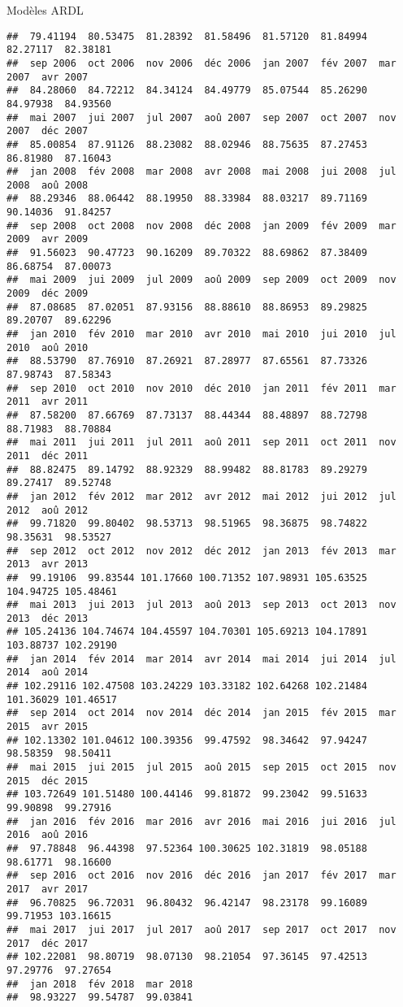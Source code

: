 \documentclass[10pt,xcolor=table,color={dvipsnames,usenames},ignorenonframetext,usepdftitle=false,french]{beamer}
\begin{document}
\begin{frame}[fragile]{Modèles ARDL}
\begin{verbatim}
##  79.41194  80.53475  81.28392  81.58496  81.57120  81.84994  82.27117  82.38181 
##  sep 2006  oct 2006  nov 2006  déc 2006  jan 2007  fév 2007  mar 2007  avr 2007 
##  84.28060  84.72212  84.34124  84.49779  85.07544  85.26290  84.97938  84.93560 
##  mai 2007  jui 2007  jul 2007  aoû 2007  sep 2007  oct 2007  nov 2007  déc 2007 
##  85.00854  87.91126  88.23082  88.02946  88.75635  87.27453  86.81980  87.16043 
##  jan 2008  fév 2008  mar 2008  avr 2008  mai 2008  jui 2008  jul 2008  aoû 2008 
##  88.29346  88.06442  88.19950  88.33984  88.03217  89.71169  90.14036  91.84257 
##  sep 2008  oct 2008  nov 2008  déc 2008  jan 2009  fév 2009  mar 2009  avr 2009 
##  91.56023  90.47723  90.16209  89.70322  88.69862  87.38409  86.68754  87.00073 
##  mai 2009  jui 2009  jul 2009  aoû 2009  sep 2009  oct 2009  nov 2009  déc 2009 
##  87.08685  87.02051  87.93156  88.88610  88.86953  89.29825  89.20707  89.62296 
##  jan 2010  fév 2010  mar 2010  avr 2010  mai 2010  jui 2010  jul 2010  aoû 2010 
##  88.53790  87.76910  87.26921  87.28977  87.65561  87.73326  87.98743  87.58343 
##  sep 2010  oct 2010  nov 2010  déc 2010  jan 2011  fév 2011  mar 2011  avr 2011 
##  87.58200  87.66769  87.73137  88.44344  88.48897  88.72798  88.71983  88.70884 
##  mai 2011  jui 2011  jul 2011  aoû 2011  sep 2011  oct 2011  nov 2011  déc 2011 
##  88.82475  89.14792  88.92329  88.99482  88.81783  89.29279  89.27417  89.52748 
##  jan 2012  fév 2012  mar 2012  avr 2012  mai 2012  jui 2012  jul 2012  aoû 2012 
##  99.71820  99.80402  98.53713  98.51965  98.36875  98.74822  98.35631  98.53527 
##  sep 2012  oct 2012  nov 2012  déc 2012  jan 2013  fév 2013  mar 2013  avr 2013 
##  99.19106  99.83544 101.17660 100.71352 107.98931 105.63525 104.94725 105.48461 
##  mai 2013  jui 2013  jul 2013  aoû 2013  sep 2013  oct 2013  nov 2013  déc 2013 
## 105.24136 104.74674 104.45597 104.70301 105.69213 104.17891 103.88737 102.29190 
##  jan 2014  fév 2014  mar 2014  avr 2014  mai 2014  jui 2014  jul 2014  aoû 2014 
## 102.29116 102.47508 103.24229 103.33182 102.64268 102.21484 101.36029 101.46517 
##  sep 2014  oct 2014  nov 2014  déc 2014  jan 2015  fév 2015  mar 2015  avr 2015 
## 102.13302 101.04612 100.39356  99.47592  98.34642  97.94247  98.58359  98.50411 
##  mai 2015  jui 2015  jul 2015  aoû 2015  sep 2015  oct 2015  nov 2015  déc 2015 
## 103.72649 101.51480 100.44146  99.81872  99.23042  99.51633  99.90898  99.27916 
##  jan 2016  fév 2016  mar 2016  avr 2016  mai 2016  jui 2016  jul 2016  aoû 2016 
##  97.78848  96.44398  97.52364 100.30625 102.31819  98.05188  98.61771  98.16600 
##  sep 2016  oct 2016  nov 2016  déc 2016  jan 2017  fév 2017  mar 2017  avr 2017 
##  96.70825  96.72031  96.80432  96.42147  98.23178  99.16089  99.71953 103.16615 
##  mai 2017  jui 2017  jul 2017  aoû 2017  sep 2017  oct 2017  nov 2017  déc 2017 
## 102.22081  98.80719  98.07130  98.21054  97.36145  97.42513  97.29776  97.27654 
##  jan 2018  fév 2018  mar 2018 
##  98.93227  99.54787  99.03841
\end{verbatim}

\end{frame}
\end{document}
